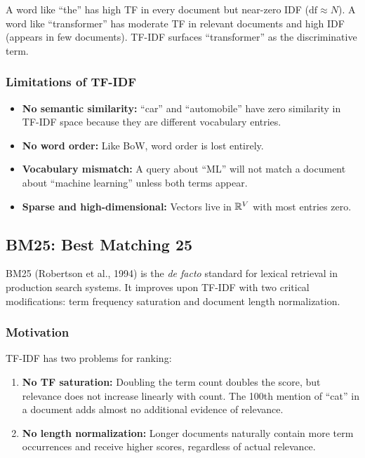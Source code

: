 A word like ``the'' has high TF in every document but near-zero IDF ($\text{df}
\approx N$). A word like ``transformer'' has moderate TF in relevant documents and high IDF
(appears in few documents). TF-IDF surfaces ``transformer'' as the discriminative term.

\subsubsection{Limitations of TF-IDF}

\begin{itemize}
    \item \textbf{No semantic similarity:} ``car'' and ``automobile'' have zero similarity
    in TF-IDF space because they are different vocabulary entries.
    \item \textbf{No word order:} Like BoW, word order is lost entirely.
    \item \textbf{Vocabulary mismatch:} A query about ``ML'' will not match a document
    about ``machine learning'' unless both terms appear.
    \item \textbf{Sparse and high-dimensional:} Vectors live in $\mathbb{R}^V$ with most
    entries zero.
\end{itemize}

\subsection{BM25: Best Matching 25}
\label{sec:bm25}

BM25 (Robertson et al., 1994) is the \emph{de facto} standard for lexical retrieval in
production search systems. It improves upon TF-IDF with two critical modifications:
term frequency saturation and document length normalization.

\subsubsection{Motivation}

TF-IDF has two problems for ranking:
\begin{enumerate}
    \item \textbf{No TF saturation:} Doubling the term count doubles the score, but
    relevance does not increase linearly with count. The 100th mention of ``cat'' in a
    document adds almost no additional evidence of relevance.
    \item \textbf{No length normalization:} Longer documents naturally contain more term
    occurrences and receive higher scores, regardless of actual relevance.
\end{enumerate}


